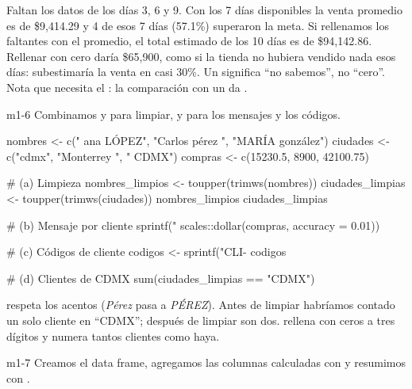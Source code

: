 Faltan los datos de los días 3, 6 y 9. Con los 7 días disponibles la venta
promedio es de \$9,414.29 y 4 de esos 7 días (57.1\%) superaron la meta.
Si rellenamos los faltantes con el promedio, el total estimado de los 10
días es de \$94,142.86. Rellenar con cero daría \$65,900, como si la tienda
no hubiera vendido nada esos días: subestimaría la venta en casi 30\%. Un
 significa ``no sabemos'', no ``cero''. Nota que
 necesita el
: la comparación con un  da .


\begin{solucion}{m1-6}
Combinamos  y  para limpiar, y
 para los mensajes y los códigos.
\end{solucion}

\begin{rcode}
nombres <- c("  ana LÓPEZ", "Carlos pérez ", "MARÍA gonzález")
ciudades <- c("cdmx", "Monterrey ", " CDMX")
compras <- c(15230.5, 8900, 42100.75)

# (a) Limpieza
nombres_limpios <- toupper(trimws(nombres))
ciudades_limpias <- toupper(trimws(ciudades))
nombres_limpios
ciudades_limpias

# (b) Mensaje por cliente
sprintf("%
        scales::dollar(compras, accuracy = 0.01))

# (c) Códigos de cliente
codigos <- sprintf("CLI-%
codigos

# (d) Clientes de CDMX
sum(ciudades_limpias == "CDMX")
\end{rcode}

 respeta los acentos (\emph{Pérez} pasa a
\emph{PÉREZ}). Antes de limpiar habríamos contado un solo cliente en
``CDMX''; después de limpiar son dos.  rellena con ceros a
tres dígitos y  numera tantos clientes como haya.


\begin{solucion}{m1-7}
Creamos el data frame, agregamos las columnas calculadas con
 y resumimos con .
\end{solucion}

